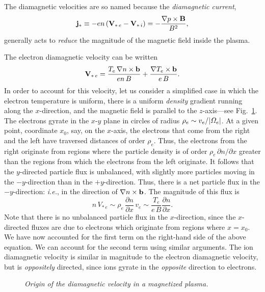The diamagnetic velocities are so named because the {\em diamagnetic
current},
\begin{equation}
{\bf j}_\ast \equiv - en\,({\bf V}_{\ast\,e}-{\bf V}_{\ast\,i})
=-\frac{\nabla p\times{\bf B}}{B^2},
\end{equation}
generally acts to {\em reduce}\/ the magnitude of the magnetic field inside
 the plasma. 

The electron diamagnetic velocity can be written
\begin{equation}
{\bf V}_{\ast\,e} = \frac{T_e\,\nabla n\times{\bf b}}{en\,B} + \frac{
\nabla T_e\times{\bf b}}{e\,B}.
\end{equation}
In order to account for this velocity, let us consider a simplified
case in which the electron temperature is uniform, there is a
uniform {\em density}\/ gradient running along the $x$-direction, and the magnetic
field is parallel to the $z$-axis---see Fig.~\ref{f9}.
The electrons gyrate in the $x$-$y$ plane in circles of radius $\rho_e\sim v_e/
|{\mit\Omega}_e|$. At a given point, coordinate $x_0$, say, on the $x$-axis, 
the electrons that come from the right and the left have traversed distances
of order $\rho_e$. Thus, the electrons from the right originate from
regions where the particle density is of order $\rho_e\,\partial n/\partial x$
greater than the regions from which the electrons from the left originate. 
It follows  that the $y$-directed particle flux 
is unbalanced, with slightly more particles moving in the $-y$-direction
than in the $+y$-direction. Thus, there is a net particle flux
in the $-y$-direction: {\em i.e.}, in the direction of $\nabla n \times{\bf b}$. 
The magnitude of this flux is 
\begin{equation}
n\,V_{\ast\,e} \sim \rho_e\,\frac{\partial n}{\partial x}\,v_e \sim 
\frac{T_e}{e\,B} \frac{\partial n}{\partial x}.
\end{equation}
Note that there is no unbalanced particle flux in the $x$-direction, since the
$x$-directed fluxes are due to electrons which originate from regions
where $x=x_0$. We have now accounted for the first term on the
right-hand side of the above equation.
We can account for the second term using similar arguments. 
The ion diamagnetic velocity is similar in magnitude to the electron
diamagnetic velocity, but is {\em  oppositely}\/ directed, since ions gyrate
in the {\em opposite}\/ direction to electrons. 

\begin{figure}
\epsfysize=3in
\centerline{}
\caption{\em Origin of the diamagnetic velocity in a magnetized plasma.}\label{f9}
\end{figure}

